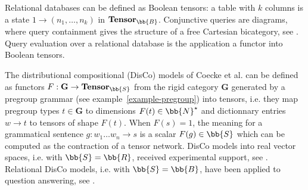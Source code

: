 \begin{example}
Relational databases can be defined as Boolean tensors: a table with $k$ columns is a state $1 \to (n_1, \dots, n_k)$ in $\mathbf{Tensor}_\bb{B}$.
Conjunctive queries are diagrams, where query containment gives the structure of a free Cartesian bicategory, see \cite{BonchiEtAl18}.
Query evaluation over a relational database is the application a functor into Boolean tensors.
\end{example}

\begin{example}\label{example-discocat}
The distributional compositional (DisCo) models of Coecke et al.
\cite{ClarkEtAl08,ClarkEtAl10} can be defined as functors
$F : \mathbf{G} \to \mathbf{Tensor}_\bb{S}$ from the rigid category $\mathbf{G}$ generated by
a pregroup grammar (see example~\ref{example-pregroup}) into tensors, i.e. they map pregroup types $t \in \mathbf{G}$ to dimensions $F(t) \in \bb{N}^\star$ and dictionnary entries $w \to t$ to tensors of shape $F(t)$.
When $F(s) = 1$, the meaning for a grammatical sentence $g : w_1 \dots w_n \to s$ is a scalar $F(g) \in \bb{S}$ which can be computed as the contraction of a tensor network.
DisCo models into real vector spaces, i.e. with $\bb{S} = \bb{R}$, received experimental support, see \cite{GrefenstetteSadrzadeh11,KartsaklisEtAl12,KartsaklisEtAl13}.
Relational DisCo models, i.e. with $\bb{S} = \bb{B}$, have been applied to question answering, see \cite{CoeckeEtAl18a, DeFeliceEtAl19a}.
\end{example}
